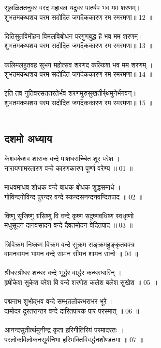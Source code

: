 सुलळिततनुवर वरद महाबल यदुवर पार्त्थप भव मम शरणम्।\\
शुभतमकथशय परम सदोदित जगदॆककारण रम रमरमणा॥ 12 ॥\\
\\
दितिसुतविमॊहन विमलविबोधन परगुणबुद्ध हॆ भव मम शरणम्।\\
शुभतमकथशय परम सदोदित जगदॆककारण रम रमरमणा॥ 13 ॥\\
\\
कलिमलहुतवह सुभग महोत्सव शरणद कल्किश भव मम शरणम् ।\\
शुभतमकथशय परम सदोदित जगदॆककारण रम रमरमणा॥ 14 ॥\\
\\
इति तव नुतिवरसततरतेर्भव शरणमुरुसुखतीर्र्थमुनेर्भगवन्।\\
शुभतमकथशय परम सदोदित जगदॆककारण रम रमरमणा॥ 15 ॥\\
\\
\subsection{\sanskrit दशमो अध्याय}
\sanskrit
 केशवकेशव शासक वन्दे पाशधरार्च्चित शूर परेश ।\\
नारायणामरतारण वन्दे कारणकारण पूर्ण्ण वरेण्य ॥ 01 ॥\\
\\
माधवमाधव शोधक वन्दे बाधक बोधक शुद्धसमाधे ।\\
गोविन्दगोविन्द पुरन्दर वन्दे स्कन्दसनन्दनवन्दितपाद ॥ 02 ॥\\
\\
विष्णु सृजिष्णु ग्रसिष्णु वि वन्दे कृष्ण सदुष्णवधिष्ण स्वधृष्णो ।\\
मधुसूदन दानवसादन वन्दे दैवतमोदन वेदितपाद ॥ 03 ॥\\
\\
त्रिविक्रम निष्क्रम विक्रम वन्दे सुक्रम सङ्क्रमहुङ्कृतवक्त्र ।\\
वामनवामन भामन वन्दे सामन सीमन शामन सानो ॥ 04 ॥\\
\\
श्रीधरश्रीधर शन्धर वन्दे भूर्द्धर वार्द्धर कन्धरधारिन् ।\\
हृषीकेश सुकेश परेश वि वन्दे शरणेश कलेश बलेश सुखेश ॥ 05 ॥\\
\\
पद्मनाभ शुभोद्भव वन्दे सम्भृतलोकभराभर भूरे ।\\
दामोदर दूरतरान्तर वन्दे दारितपारक पार परस्मात् ॥ 06 ॥\\
\\
आनन्दसुतीर्त्थमुनीन्द्र कृता हरिगीतिरियं परमादरतः ।\\
परलोकविलोकनसूर्यनिभा हरिभक्तिविवर्द्धनशौण्डतमा ॥ 07 ॥\\
\\
